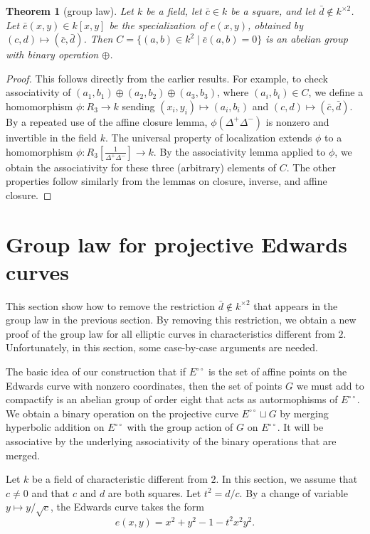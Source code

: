 \documentclass[18pt]{article}
\newtheorem{theorem}{Theorem}[section]
\newcommand{\f}[1]{\frac{1}{#1}}
\newcommand{\Eoo}{E^{\circ\circ}}
\begin{document}
\begin{theorem}[group law]\label{thm:group} 
  Let $k$ be a field, let $\bar c \in k$ be a square, and let $\bar
  d\not\in k^{\times 2}$.  Let $\bar e(x,y) \in k[x,y]$ be the
  specialization of $e(x,y)$, obtained by $(c,d)\mapsto (\bar c,\bar
  d)$.  Then $C= \{(a,b)\in k^2 \mid \bar e(a,b) = 0\}$ is an abelian
  group with binary operation $\oplus$.
\end{theorem}

\begin{proof} This follows directly from the earlier results.  For
  example, to check associativity of $(a_1,b_1)\oplus (a_2,b_2) \oplus
  (a_3,b_3)$, where $(a_i,b_i)\in C$, we define a homomorphism
  $\phi:R_3\to k$ sending $(x_i,y_i)\mapsto (a_i,b_i)$ and
  $(c,d)\mapsto (\bar c,\bar d)$.  By a repeated use of the affine
  closure lemma, $\phi(\Delta^+\Delta^-)$ is nonzero and invertible in
  the field $k$.  The universal property of localization extends
  $\phi$ to a homomorphism $\phi:R_3[\f{\Delta^+\Delta^-}]\to k$.  By
  the associativity lemma applied to $\phi$, we obtain the
  associativity for these three (arbitrary) elements of $C$.  The
  other properties follow similarly from the lemmas on closure,
  inverse, and affine closure.
\end{proof}

\section{Group law for projective Edwards curves}

This section show how to remove the restriction $\bar d\not\in
k^{\times 2}$ that appears in the group law in the previous section.
By removing this restriction, we obtain a new proof of the group law for all elliptic
curves in characteristics different from $2$.  Unfortunately, in this
section, some case-by-case arguments are needed.

The basic idea of our construction that if $\Eoo$ is the set of affine
points on the Edwards curve with nonzero coordinates, then the set of
points $G$ we must add to compactify is an abelian group of order eight that acts
as autormophisms of $\Eoo$.  We obtain a binary operation on the
projective curve $\Eoo\sqcup G$ by merging hyperbolic addition on $\Eoo$
with the group action of $G$ on $\Eoo$.  It will be associative by the
underlying associativity of the binary operations that are merged.


Let $k$ be a field of characteristic different from $2$.  In this
section, we assume that $c\ne 0$ and that $c$ and $d$ are both
squares.  Let $t^2 = d/c$.  By a change of variable $y\mapsto
y/\sqrt{c}$, the Edwards curve takes the form
\begin{equation}\label{eqn:t}
e(x,y)= x^2 + y^2 -1 - t^2 x^2 y^2.
\end{equation}
\end{document}

